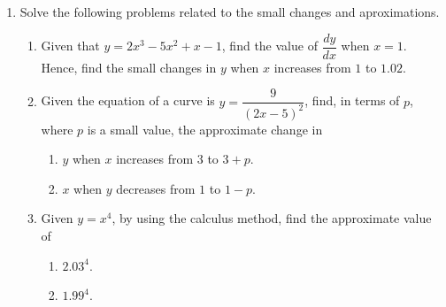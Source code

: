 \documentclass{report}
\begin{document}
\begin{multicols*}{2}
\begin{enumerate}
            \item Solve the following problems related to the small changes and aproximations.
                  \begin{enumerate}
                        \item Given that $y = 2x^3 - 5x^2 + x - 1$, find the value of $\dfrac{dy}{dx}$ when
                              $x = 1$. Hence, find the small changes in $y$ when $x$ increases from $1$ to
                              $1.02$.
                        \item Given the equation of a curve is $y = \dfrac{9}{{(2x - 5)}^2}$, find, in terms
                              of $p$, where $p$ is a small value, the approximate change in
                              \begin{enumerate}
                                    \item $y$ when $x$ increases from $3$ to $3 + p$.
                                    \item $x$ when $y$ decreases from $1$ to $1 - p$.
                              \end{enumerate}
                        \item Given $y = x^4$, by using the calculus method, find the approximate value of
                              \begin{enumerate}
                                    \item $2.03^4$.
                                    \item $1.99^4$.
                              \end{enumerate}
                  \end{enumerate}


\end{enumerate}
\end{multicols*}
\end{document}
